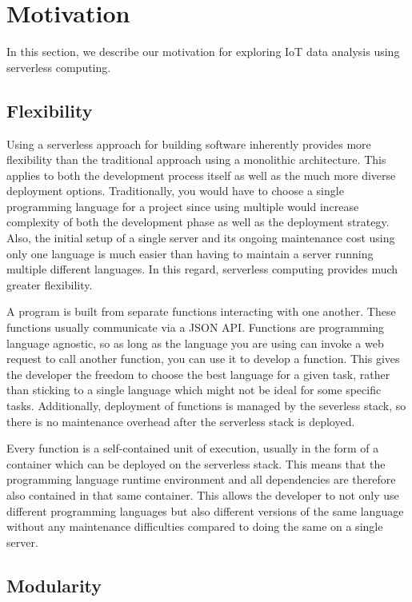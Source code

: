 \section{Motivation}

In this section, we describe our motivation for exploring IoT data analysis using serverless
computing.


\subsection{Flexibility}

Using a serverless approach for building software inherently provides more flexibility than the
traditional approach using a monolithic architecture. This applies to both the development process
itself as well as the much more diverse deployment options. Traditionally, you would have to choose
a single programming language for a project since using multiple would increase complexity of both
the development phase as well as the deployment strategy. Also, the initial setup of a single server
and its ongoing maintenance cost using only one language is much easier than having to maintain a
server running multiple different languages. In this regard, serverless computing provides much
greater flexibility.

A program is built from separate functions interacting with one another. These
functions usually communicate via a JSON API. Functions are programming language agnostic, so as
long as the language you are using can invoke a web request to call another function, you can use it
to develop a function. This gives the developer the freedom to choose the best language for a given
task, rather than sticking to a single language which might not be ideal for some specific tasks.
Additionally, deployment of functions is managed by the severless stack, so there is no maintenance
overhead after the serverless stack is deployed.

Every function is a self-contained unit of execution, usually in the form of a container which can
be deployed on the serverless stack. This means that the programming language runtime environment
and all dependencies are therefore also contained in that same container. This allows the developer
to not only use different programming languages but also different versions of the same language
without any maintenance difficulties compared to doing the same on a single server.

\subsection{Modularity}

